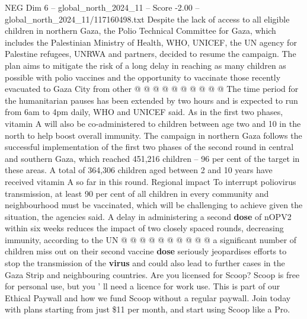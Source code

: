 \begin{textsample}{NEG Dim 6 – global\_north\_2024\_11 – Score -2.00 – global\_north\_2024\_11/117160498.txt}
Despite the lack of access to all eligible children in northern Gaza, the Polio Technical Committee for Gaza, which includes the Palestinian Ministry of Health, WHO, UNICEF, the UN agency for Palestine refugees, UNRWA and partners, decided to resume the campaign.
The plan aims to mitigate the risk of a long delay in reaching as many children as possible with polio vaccines and the opportunity to vaccinate those recently evacuated to Gaza City from other @ @ @ @ @ @ @ @ @ @ The time period for the humanitarian pauses has been extended by two hours and is expected to run from 6am to 4pm daily, WHO and UNICEF said.
As in the first two phases, vitamin A will also be co-administered to children between age two and 10 in the north to help boost overall immunity.
The campaign in northern Gaza follows the successful implementation of the first two phases of the second round in central and southern Gaza, which reached 451,216 children -- 96 per cent of the target in these areas.
A total of 364,306 children aged between 2 and 10 years have received vitamin A so far in this round.
Regional impact To interrupt poliovirus transmission, at least 90 per cent of all children in every community and neighbourhood must be vaccinated, which will be challenging to achieve given the situation, the agencies said.
A delay in administering a second \textbf{dose} of nOPV2 within six weeks reduces the impact of two closely spaced rounds, decreasing immunity, according to the UN @ @ @ @ @ @ @ @ @ @ a significant number of children miss out on their second vaccine \textbf{dose} seriously jeopardises efforts to stop the transmission of the \textbf{virus} and could also lead to further cases in the Gaza Strip and neighbouring countries.
Are you licensed for Scoop?
Scoop is free for personal use, but you ' ll need a licence for work use.
This is part of our Ethical Paywall and how we fund Scoop without a regular paywall.
Join today with plans starting from just \$11 per month, and start using Scoop like a Pro.

\end{textsample}
